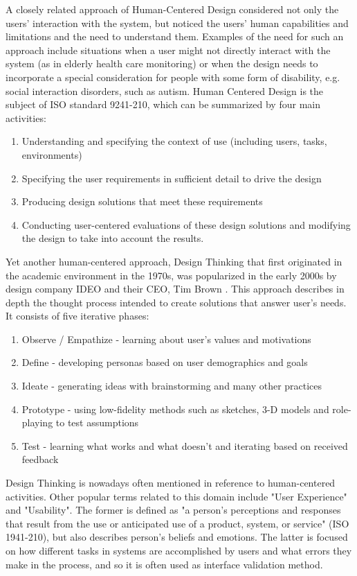 \documentclass{article}
\begin{document}
A closely related approach of Human-Centered Design considered not only the users' interaction with the system, but noticed the users' human capabilities and limitations and the need to understand them. Examples of the need for such an approach include situations when a user might not directly interact with the system (as in elderly health care monitoring) or when the design needs to incorporate a special consideration for people with some form of disability, e.g. social interaction disorders, such as autism. Human Centered Design is the subject of ISO standard 9241-210, which can be summarized by four main activities:
\begin{enumerate}
  \item Understanding and specifying the context of use (including users, tasks, environments)
  \item Specifying the user requirements in sufficient detail to drive the design
  \item Producing design solutions that meet these requirements
  \item Conducting user-centered evaluations of these design solutions and modifying the design to take into account the results.
\end{enumerate}

Yet another human-centered approach, Design Thinking that first originated in the academic environment in the 1970s, was popularized in the early 2000s by design company IDEO and their CEO, Tim Brown \citep{brown2009change}. This approach describes in depth the thought process intended to create solutions that answer user's needs. It consists of five iterative phases:
\begin{enumerate}
    \item Observe / Empathize - learning about user's values and motivations
    \item Define - developing personas based on user demographics and goals
    \item Ideate - generating ideas with brainstorming and many other practices
    \item Prototype - using low-fidelity methods such as sketches, 3-D models and role-playing to test assumptions
    \item Test - learning what works and what doesn't and iterating based on received feedback
\end{enumerate}
Design Thinking is nowadays often mentioned in reference to human-centered activities. Other popular terms related to this domain include "User Experience" and "Usability". The former is defined as "a person's perceptions and responses that result from the use or anticipated use of a product, system, or service" (ISO 1941-210), but also describes person's beliefs and emotions. The latter is focused on how different tasks in systems are accomplished by users and what errors they make in the process, and so it is often used as interface validation method. 
\end{document}
